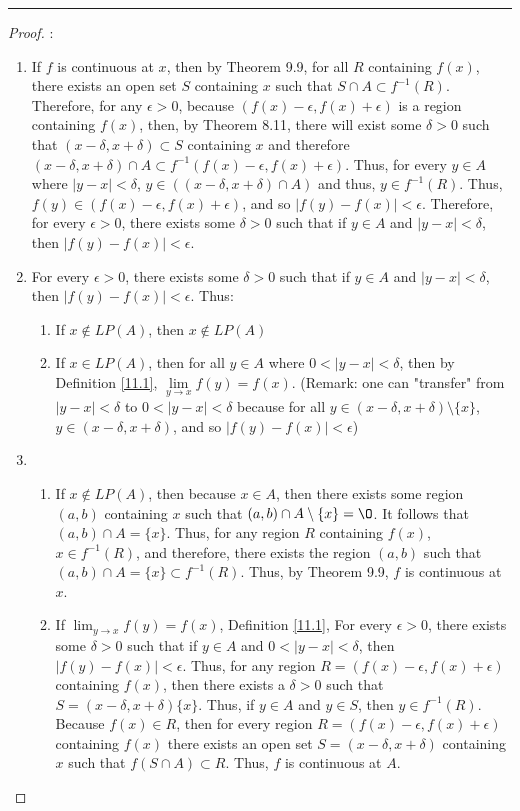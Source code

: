 \documentclass[openany, amssymb, psamsfonts]{amsart}
\renewcommand{\emptyset}{\O}
\newcommand{\sm}{\setminus}
\theoremstyle{definition}
\numberwithin{equation}{section}
\begin{document}
 \vspace{4pt}     \hrule   \vspace{4pt}\begin{proof}:\\
\begin{enumerate}
\item If $f$ is continuous at $x$, then by Theorem 9.9, for all $R$ containing $f(x)$, there exists an open set $S$ containing $x$ such that $S\cap A \subset f^{-1}(R)$. Therefore, for any $\epsilon >0$, because $(f(x)-\epsilon, f(x)+ \epsilon)$ is a region containing $f(x)$, then, by Theorem 8.11, there will exist some $\delta >0$ such that $(x-\delta, x+ \delta) \subset S$ containing $x$ and therefore $(x-\delta, x+ \delta)\cap A \subset f^{-1}(f(x)-\epsilon, f(x)+ \epsilon)$. Thus, for every $y\in A$ where $|y-x|<\delta$, $y\in ((x-\delta, x+ \delta)\cap A)$ and thus, $y\in f^{-1}(R)$. Thus, $f(y) \in (f(x) - \epsilon, f(x) + \epsilon)$, and so $|f(y)- f(x)|< \epsilon$. Therefore, for every $\epsilon >0$, there exists some $\delta>0$ such that if $y\in A$ and $|y-x| < \delta$, then $|f(y)-f(x)|<\epsilon$. 
\item For every $\epsilon >0$, there exists some $\delta>0$ such that if $y\in A$ and $|y-x| < \delta$, then $|f(y)-f(x)|<\epsilon$. Thus:
\begin{enumerate}
\item If $x\notin LP(A)$, then $x\notin LP(A)$
\item If $x\in LP(A)$, then for all $y\in A$ where $0<|y-x|< \delta$, then by Definition \ref{11.1}, $\lim\limits_{y\to x}f(y) = f(x)$. (Remark: one can "transfer" from $|y-x|< \delta$ to $0<|y-x|<\delta$ because for all $y\in (x-\delta, x+\delta)\sm\{x\}$, $y\in (x-\delta, x+ \delta)$, and so $|f(y) - f(x)|< \epsilon$)
\end{enumerate}
\item \begin{enumerate}
\item If $x\notin LP(A)$, then because $x\in A$, then there exists some region $(a,b)$ containing $x$ such that $(a,b) \cap A\sm \{x\} = \emptyset$. It follows that $(a,b)\cap A = \{x\}$. Thus, for any region $R$ containing $f(x)$, $x\in f^{-1}(R)$, and therefore, there exists the region $(a,b)$ such that $(a,b)\cap A = \{x\} \subset f^{-1}(R)$. Thus, by Theorem 9.9, $f$ is continuous at $x$.
\item If $\displaystyle \lim_{y \to x} f(y) = f(x)$, Definition \ref{11.1}, For every $\epsilon >0$, there exists some $\delta>0$ such that if $y\in A$ and $0<|y-x| < \delta$, then $|f(y)-f(x)|<\epsilon$. Thus, for any region $R = (f(x) - \epsilon, f(x) + \epsilon)$ containing $f(x)$, then there exists a $\delta>0$ such that $S = (x-\delta, x+ \delta)\{x\}$. Thus, if $y\in A$ and $y\in S$, then $y\in f^{-1}(R)$. Because $f(x) \in R$, then for every region $R = (f(x) - \epsilon, f(x) + \epsilon)$ containing $f(x)$ there exists an open set $S = (x-\delta, x+ \delta)$ containing $x$ such that $f(S \cap A)\subset R$. Thus, $f$ is continuous at $A$.

\end{enumerate}
\end{enumerate}
\end{proof}
\end{document}
